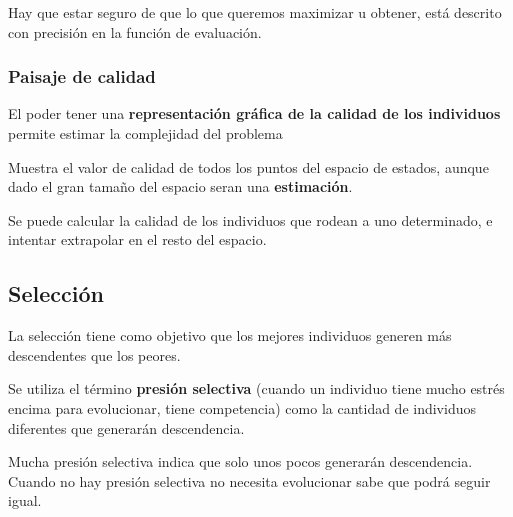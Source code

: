 \documentclass[12pt, twoside, openright]{report} %
\begin{document}
Hay que estar seguro de que lo que queremos maximizar u obtener, está descrito con precisión en la función de evaluación.
\subsubsection{Paisaje de calidad}
El poder tener una \textbf{representación gráfica de la calidad de los individuos} permite estimar la complejidad del problema

Muestra el valor de calidad de todos los puntos del espacio de estados, aunque dado el gran tamaño del espacio seran una \textbf{estimación}.

Se puede calcular la calidad de los individuos que rodean a uno determinado, e intentar extrapolar en el resto del espacio.

\subsection{Selección}
La selección tiene como objetivo que los mejores individuos generen más descendentes que los peores.

Se utiliza el término \textbf{presión selectiva} (cuando un individuo tiene mucho estrés encima para evolucionar, tiene competencia) como la cantidad de individuos diferentes que generarán descendencia.

Mucha presión selectiva indica que solo unos pocos generarán descendencia. Cuando no hay presión selectiva no necesita evolucionar sabe que podrá seguir igual.
\pagebreak
\end{document}
